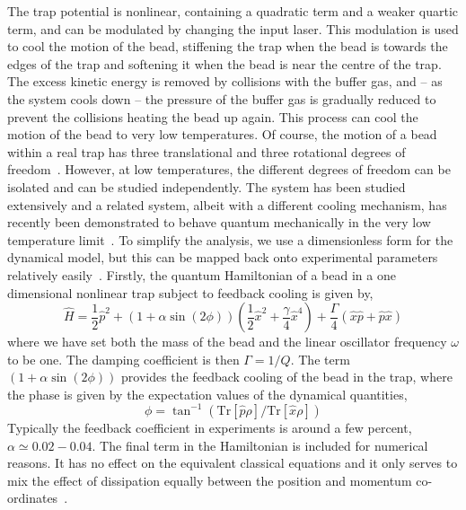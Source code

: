 \documentclass[conference]{IEEEtran}
\begin{document}
The trap potential is nonlinear, containing a quadratic term and a weaker quartic term, and can be modulated by changing the input laser. This modulation is used to cool the motion of the bead, stiffening the trap when the bead is towards the edges of the trap and softening it when the bead is near the centre of the trap. The excess kinetic energy is removed by collisions with the buffer gas, and -- as the system cools down -- the pressure of the buffer gas is gradually reduced to prevent the collisions heating the bead up again. This process can cool the motion of the bead to very low temperatures. Of course, the motion of a bead within a real trap has three translational and three rotational degrees of freedom~\cite{Rom2011,Sti2016,Ral2016}. However, at low temperatures, the different degrees of freedom can be isolated and can be studied independently. The system has been studied extensively and a related system, albeit with a different cooling mechanism, has recently been demonstrated to behave quantum mechanically in the very low temperature limit~\cite{Del2020}. To simplify the analysis, we use a dimensionless form for the dynamical model, but this can be mapped back onto experimental parameters relatively easily~\cite{Gie2015}. Firstly, the quantum Hamiltonian of a bead in a one dimensional nonlinear trap subject to feedback cooling is given by,
\begin{equation}\label{DuffHam2}
\hat{H} = \frac{1}{2}\hat{p}^2+(1+\alpha\sin(2\phi))(\frac{1}{2}\hat{x}^2+\frac{\gamma}{4}\hat{x}^4)+\frac{\Gamma}{4}(\hat{x}\hat{p}+\hat{p}\hat{x})
\end{equation}
where we have set both the mass of the bead and the linear oscillator frequency $\omega$ to be one. The damping coefficient is then $\Gamma = 1/Q$. The term $(1+\alpha\sin(2\phi))$ provides the feedback cooling of the bead in the trap, where the phase is given by the expectation values of the dynamical quantities,
$$
\phi = \tan^{-1}{(\mathrm{Tr}[\hat{p}\rho]/\mathrm{Tr}[\hat{x}\rho])}
$$
Typically the feedback coefficient in experiments is around a few percent, $\alpha\simeq 0.02-0.04$. The final term in the Hamiltonian is included for numerical reasons. It has no effect on the equivalent classical equations and it only serves to mix the effect of dissipation equally between the position and momentum co-ordinates~\cite{Bru1996}. 
\end{document}
